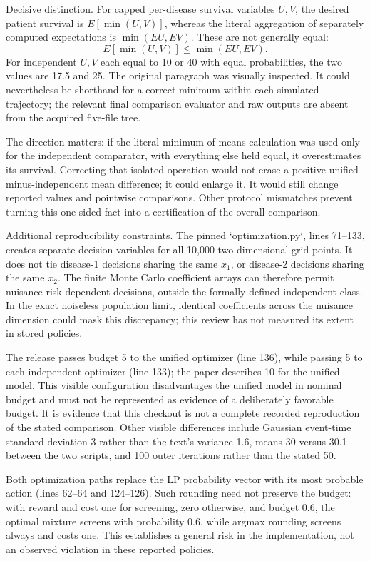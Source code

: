 \documentclass[10pt]{article}
\begin{document}
Decisive distinction. For capped per-disease survival variables \(U,V\), the desired patient survival is \(E[\min(U,V)]\), whereas the literal aggregation of separately computed expectations is \(\min(EU,EV)\). These are not generally equal: \[E[\min(U,V)]\leq \min(EU,EV).\] For independent \(U,V\) each equal to 10 or 40 with equal probabilities, the two values are 17.5 and 25. The original paragraph was visually inspected. It could nevertheless be shorthand for a correct minimum within each simulated trajectory; the relevant final comparison evaluator and raw outputs are absent from the acquired five-file tree.\par
The direction matters: if the literal minimum-of-means calculation was used only for the independent comparator, with everything else held equal, it overestimates its survival. Correcting that isolated operation would not erase a positive unified-minus-independent mean difference; it could enlarge it. It would still change reported values and pointwise comparisons. Other protocol mismatches prevent turning this one-sided fact into a certification of the overall comparison.\par
Additional reproducibility constraints. The pinned `optimization.py`, lines 71–133, creates separate decision variables for all 10,000 two-dimensional grid points. It does not tie disease-1 decisions sharing the same \(x_1\), or disease-2 decisions sharing the same \(x_2\). The finite Monte Carlo coefficient arrays can therefore permit nuisance-risk-dependent decisions, outside the formally defined independent class. In the exact noiseless population limit, identical coefficients across the nuisance dimension could mask this discrepancy; this review has not measured its extent in stored policies.\par
The release passes budget 5 to the unified optimizer (line 136), while passing 5 to each independent optimizer (line 133); the paper describes 10 for the unified model. This visible configuration disadvantages the unified model in nominal budget and must not be represented as evidence of a deliberately favorable budget. It is evidence that this checkout is not a complete recorded reproduction of the stated comparison. Other visible differences include Gaussian event-time standard deviation 3 rather than the text’s variance 1.6, means 30 versus 30.1 between the two scripts, and 100 outer iterations rather than the stated 50.\par
Both optimization paths replace the LP probability vector with its most probable action (lines 62–64 and 124–126). Such rounding need not preserve the budget: with reward and cost one for screening, zero otherwise, and budget \(0.6\), the optimal mixture screens with probability \(0.6\), while argmax rounding screens always and costs one. This establishes a general risk in the implementation, not an observed violation in these reported policies.\par
\end{document}
